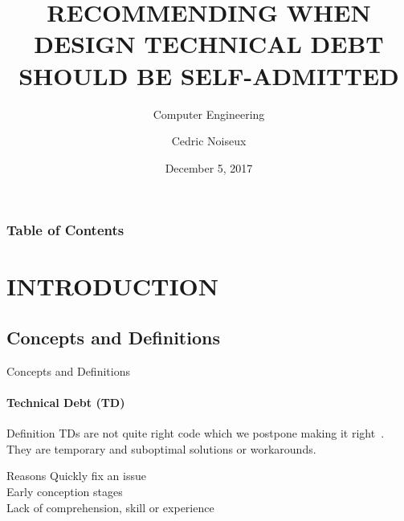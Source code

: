 \documentclass{beamer}
\title{
RECOMMENDING WHEN DESIGN TECHNICAL DEBT SHOULD BE SELF-ADMITTED} %
\subtitle{Computer Engineering} %
\author{Cedric Noiseux}
\date{December 5, 2017}
\begin{document}
	\begin{darkframes}
		
		\frame{\maketitle}
  
  		
		\begin{frame}[allowframebreaks]
			\frametitle{Table of Contents}
			\tableofcontents[sections={1-2}]
				\framebreak
			\tableofcontents[sections={3-4}]
		\end{frame}
	
		\section{INTRODUCTION}
		
	
			\subsection{Concepts and Definitions}	 
			 
				\begin{frame}{Concepts and Definitions}	
					\framesubtitle{Technical Debt (TD)}	
					\begin{block}{Definition}
						TDs are not quite right code which we postpone making it right~\cite{cunn92}. They are temporary and suboptimal solutions or workarounds.
					\end{block}
					\begin{block}{Reasons}
						Quickly fix an issue\\
						Early conception stages\\
						Lack of comprehension, skill or experience	
					\end{block}
				\end{frame}
						

\end{darkframes}
\end{document}
